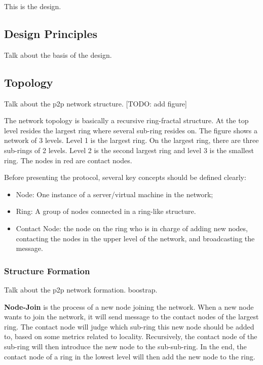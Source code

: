 This is the design. \\

\subsection{Design Principles}

Talk about the basis of the design.

\subsection{Topology}

Talk about the p2p network structure. [TODO: add figure]

The network topology is basically a recursive ring-fractal structure. At the top level resides the largest ring where several sub-ring resides on. The figure shows a network of 3 levels. Level 1 is the largest ring. On the largest ring, there are three sub-rings of 2 levels. Level 2 is the second largest ring and level 3 is the smallest ring. The nodes in red are contact nodes.

Before presenting the protocol, several key concepts should be defined clearly:
\begin{itemize}
	\item Node: One instance of a server/virtual machine in the network;
	\item Ring: A group of nodes connected in a ring-like structure.
	\item Contact Node: the node on the ring who is in charge of adding new nodes, contacting the nodes in the upper level of the network, and broadcasting the message.
\end{itemize}

\subsubsection{Structure Formation}

Talk about the p2p network formation. boostrap.

\textbf{Node-Join} is the process of a new node joining the network. When a new node wants to join the network, it will send message to the contact nodes of the largest ring. The contact node will judge which sub-ring this new node should be added to, based on some metrics related to locality. Recursively, the contact node of the sub-ring will then introduce the new node to the sub-sub-ring. In the end, the contact node of a ring in the lowest level will then add the new node to the ring.

